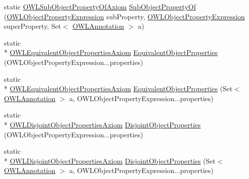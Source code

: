 \begin{DoxyCompactItemize}
\item 
static \hyperlink{interfaceorg_1_1semanticweb_1_1owlapi_1_1model_1_1_o_w_l_sub_object_property_of_axiom}{O\-W\-L\-Sub\-Object\-Property\-Of\-Axiom} \hyperlink{classorg_1_1semanticweb_1_1owlapi_1_1apibinding_1_1_o_w_l_functional_syntax_factory_ad905054bfacf32e1ed906e272cc136b9}{Sub\-Object\-Property\-Of} (\hyperlink{interfaceorg_1_1semanticweb_1_1owlapi_1_1model_1_1_o_w_l_object_property_expression}{O\-W\-L\-Object\-Property\-Expression} sub\-Property, \hyperlink{interfaceorg_1_1semanticweb_1_1owlapi_1_1model_1_1_o_w_l_object_property_expression}{O\-W\-L\-Object\-Property\-Expression} super\-Property, Set$<$ \hyperlink{interfaceorg_1_1semanticweb_1_1owlapi_1_1model_1_1_o_w_l_annotation}{O\-W\-L\-Annotation} $>$ a)
\item 
static \\*
\hyperlink{interfaceorg_1_1semanticweb_1_1owlapi_1_1model_1_1_o_w_l_equivalent_object_properties_axiom}{O\-W\-L\-Equivalent\-Object\-Properties\-Axiom} \hyperlink{classorg_1_1semanticweb_1_1owlapi_1_1apibinding_1_1_o_w_l_functional_syntax_factory_a5e582a92af6d11a767ce528d25d1bd06}{Equivalent\-Object\-Properties} (O\-W\-L\-Object\-Property\-Expression...\-properties)
\item 
static \\*
\hyperlink{interfaceorg_1_1semanticweb_1_1owlapi_1_1model_1_1_o_w_l_equivalent_object_properties_axiom}{O\-W\-L\-Equivalent\-Object\-Properties\-Axiom} \hyperlink{classorg_1_1semanticweb_1_1owlapi_1_1apibinding_1_1_o_w_l_functional_syntax_factory_a903a331a7ccbd12c01044b41d2af77a5}{Equivalent\-Object\-Properties} (Set$<$ \hyperlink{interfaceorg_1_1semanticweb_1_1owlapi_1_1model_1_1_o_w_l_annotation}{O\-W\-L\-Annotation} $>$ a, O\-W\-L\-Object\-Property\-Expression...\-properties)
\item 
static \\*
\hyperlink{interfaceorg_1_1semanticweb_1_1owlapi_1_1model_1_1_o_w_l_disjoint_object_properties_axiom}{O\-W\-L\-Disjoint\-Object\-Properties\-Axiom} \hyperlink{classorg_1_1semanticweb_1_1owlapi_1_1apibinding_1_1_o_w_l_functional_syntax_factory_a3c8f4ab6db3f2314c0da04f7a87ac80f}{Disjoint\-Object\-Properties} (O\-W\-L\-Object\-Property\-Expression...\-properties)
\item 
static \\*
\hyperlink{interfaceorg_1_1semanticweb_1_1owlapi_1_1model_1_1_o_w_l_disjoint_object_properties_axiom}{O\-W\-L\-Disjoint\-Object\-Properties\-Axiom} \hyperlink{classorg_1_1semanticweb_1_1owlapi_1_1apibinding_1_1_o_w_l_functional_syntax_factory_a025fa8c1ef64cad44d02b11d2cdaaac0}{Disjoint\-Object\-Properties} (Set$<$ \hyperlink{interfaceorg_1_1semanticweb_1_1owlapi_1_1model_1_1_o_w_l_annotation}{O\-W\-L\-Annotation} $>$ a, O\-W\-L\-Object\-Property\-Expression...\-properties)

\end{DoxyCompactItemize}
